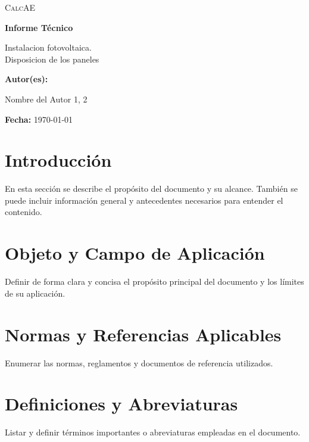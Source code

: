 \documentclass[a4paper,12pt]{article}
\let\OldTextField\TextField
\renewcommand{\TextField}[2][]{%
  \raisebox{-0.1ex}{\OldTextField[height=.95em,  bordercolor={1 1 1}, backgroundcolor={1 1 1},#1]{#2}}%
}
\begin{document}
\begin{Form}


\begin{titlepage}
    \centering
    {\scshape\LARGE CalcAE \par}
    \vspace{1cm}
    {\Huge\bfseries Informe Técnico\par}
    \vspace{2cm}
    {\Large Instalacion fotovoltaica. \\Disposicion de los paneles \par}
    \vspace{1cm}
    \vfill
    \textbf{Autor(es):}\par
    Nombre del Autor 1,\TextField[name=Tecnico,width=4cm,default=Juan Pérez]{} 2\par
    \vspace{0.5cm}
    \textbf{Fecha:} \today \par
\end{titlepage}

\tableofcontents
\newpage

\section{Introducción}
En esta sección se describe el propósito del documento y su alcance. También se puede incluir información general y antecedentes necesarios para entender el contenido.

\section{Objeto y Campo de Aplicación}
Definir de forma clara y concisa el propósito principal del documento y los límites de su aplicación.

\section{Normas y Referencias Aplicables}
Enumerar las normas, reglamentos y documentos de referencia utilizados.

\section{Definiciones y Abreviaturas}
Listar y definir términos importantes o abreviaturas empleadas en el documento.


\end{Form}
\end{document}
